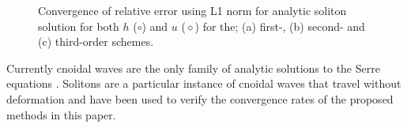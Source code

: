 \documentclass[SingleSpace,12pt]{Serre_ASCE}
\begin{document}
\begin{figure}[htb]
\centering
{}
\caption{Convergence of relative error using L1 norm for analytic soliton solution for both $h$ ($\circ$) and $u$ ($\diamond$) for the; (a) first-, (b) second- and (c) third-order schemes.}
\label{fig:solitoncon}
\end{figure}
Currently cnoidal waves are the only family of analytic solutions to the Serre equations \cite{Carter-Cienfuegos-2010-259}. Solitons are a particular instance of cnoidal waves that travel without deformation and have been used to verify the convergence rates of the proposed methods in this paper. 
\end{document}
